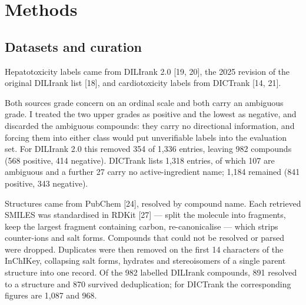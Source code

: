 %
%
%

\section{Methods}

\subsection{Datasets and curation}

Hepatotoxicity labels came from DILIrank 2.0 [19, 20], the 2025 revision of the original DILIrank list [18], and cardiotoxicity labels from DICTrank [14, 21].

Both sources grade concern on an ordinal scale and both carry an ambiguous grade. I treated the two upper grades as positive and the lowest as negative, and discarded the ambiguous compounds: they carry no directional information, and forcing them into either class would put unverifiable labels into the evaluation set. For DILIrank 2.0 this removed 354 of 1,336 entries, leaving 982 compounds (568 positive, 414 negative). DICTrank lists 1,318 entries, of which 107 are ambiguous and a further 27 carry no active-ingredient name; 1,184 remained (841 positive, 343 negative).

Structures came from PubChem [24], resolved by compound name. Each retrieved SMILES was standardised in RDKit [27] --- split the molecule into fragments, keep the largest fragment containing carbon, re-canonicalise --- which strips counter-ions and salt forms. Compounds that could not be resolved or parsed were dropped. Duplicates were then removed on the first 14 characters of the InChIKey, collapsing salt forms, hydrates and stereoisomers of a single parent structure into one record. Of the 982 labelled DILIrank compounds, 891 resolved to a structure and 870 survived deduplication; for DICTrank the corresponding figures are 1,087 and 968.

